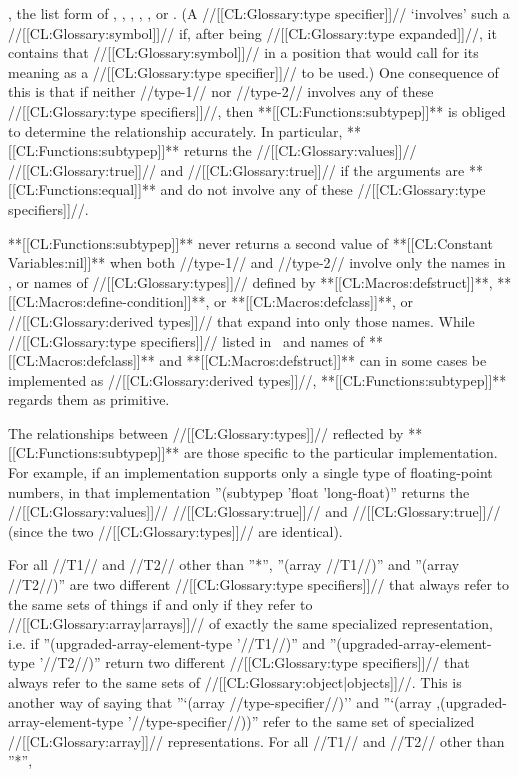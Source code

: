 , the list form of , , , , , or . (A //[[CL:Glossary:type specifier]]// `involves' such a //[[CL:Glossary:symbol]]// if, after being //[[CL:Glossary:type expanded]]//, it contains that //[[CL:Glossary:symbol]]// in a position that would call for its meaning as a //[[CL:Glossary:type specifier]]// to be used.) One consequence of this is that if neither //type-1// nor //type-2// involves any of these //[[CL:Glossary:type specifiers]]//, then **[[CL:Functions:subtypep]]** is obliged to determine the relationship accurately. In particular, **[[CL:Functions:subtypep]]** returns the //[[CL:Glossary:values]]// //[[CL:Glossary:true]]// and //[[CL:Glossary:true]]// if the arguments are **[[CL:Functions:equal]]** and do not involve any of these //[[CL:Glossary:type specifiers]]//.

**[[CL:Functions:subtypep]]** never returns a second value of **[[CL:Constant Variables:nil]]** when both //type-1// and //type-2// involve only the names in \figref\StandardizedAtomicTypeSpecs, or names of //[[CL:Glossary:types]]// defined by **[[CL:Macros:defstruct]]**, **[[CL:Macros:define-condition]]**, or **[[CL:Macros:defclass]]**, or //[[CL:Glossary:derived types]]// that expand into only those names. While //[[CL:Glossary:type specifiers]]// listed in \figref\StandardizedAtomicTypeSpecs\ and names of **[[CL:Macros:defclass]]** and **[[CL:Macros:defstruct]]** can in some cases be implemented as //[[CL:Glossary:derived types]]//, **[[CL:Functions:subtypep]]** regards them as primitive.

The relationships between //[[CL:Glossary:types]]// reflected by **[[CL:Functions:subtypep]]** are those specific to the particular implementation. For example, if an implementation supports only a single type of floating-point numbers, in that implementation ''(subtypep 'float 'long-float)'' returns the //[[CL:Glossary:values]]// //[[CL:Glossary:true]]// and //[[CL:Glossary:true]]// (since the two //[[CL:Glossary:types]]// are identical).

For all //T1// and //T2// other than ''*'', ''(array //T1//)'' and ''(array //T2//)'' are two different //[[CL:Glossary:type specifiers]]// that always refer to the same sets of things if and only if they refer to //[[CL:Glossary:array|arrays]]// of exactly the same specialized representation, i.e. if ''(upgraded-array-element-type '//T1//)'' and ''(upgraded-array-element-type '//T2//)'' return two different //[[CL:Glossary:type specifiers]]// that always refer to the same sets of //[[CL:Glossary:object|objects]]//. This is another way of saying that ''`(array //type-specifier//)'' and ''`(array ,(upgraded-array-element-type '//type-specifier//))'' refer to the same set of specialized //[[CL:Glossary:array]]// representations. For all //T1// and //T2// other than ''*'',

